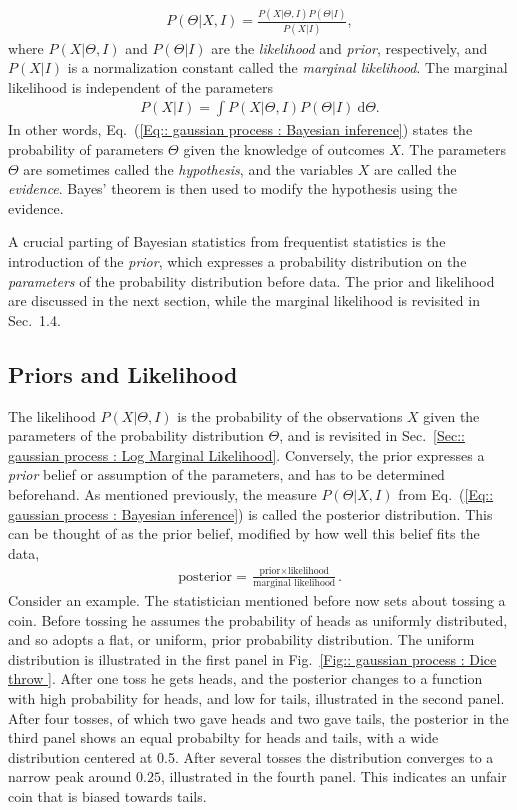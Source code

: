 \documentclass[twoside,english]{uiofysmaster}
\begin{document}
{{\begin{align}\label{Eq:: gaussian process : Bayesian inference}
P(\Theta | X , I) = \frac{P(X|\Theta, I) P(\Theta| I)}{P(X | I)},
\end{align}
where $P(X|\Theta, I)$  and $P(\Theta |I)$ are the \textit{likelihood} and \textit{prior}, respectively, and $P(X|I)$ is a normalization constant called the \textit{marginal likelihood}. The marginal likelihood is independent of the parameters
\begin{align}
P(X|I) = \int P(X| \Theta, I) P(\Theta | I)~ \text{d} \Theta.
\end{align}
In other words, Eq.~(\ref{Eq:: gaussian process : Bayesian inference}) states the probability of parameters $\Theta$ given the knowledge of outcomes $X$. The parameters $\Theta$ are sometimes called the \textit{hypothesis}, and the variables $X$ are called the \textit{evidence}. Bayes' theorem is then used to modify the hypothesis using the evidence. 

A crucial parting of Bayesian statistics from frequentist statistics is the introduction of the \textit{prior}, which expresses a probability distribution on the \textit{parameters} of the probability distribution before data. The prior and likelihood are discussed in the next section, while the marginal likelihood is revisited in Sec.~1.4.

\subsection{Priors and Likelihood}\label{Sec:: gaussian process : Priors and Likelihood}

The likelihood $P(X |\Theta, I)$ is the probability of the observations $X$ given the parameters of the probability distribution $\Theta$, and is revisited in Sec.~\ref{Sec:: gaussian process : Log Marginal Likelihood}. Conversely, the prior expresses a \textit{prior} belief or assumption of the parameters, and has to be determined beforehand. As mentioned previously, the measure $P(\Theta | X , I)$ from Eq.~(\ref{Eq:: gaussian process : Bayesian inference}) is called the posterior distribution. This can be thought of as the prior belief, modified by how well this belief fits the data,
\begin{align*}
\text{posterior} = \frac{\text{prior} \times \text{likelihood}}{\text{marginal likelihood}}.
\end{align*}
Consider an example. The statistician mentioned before now sets about tossing a coin. Before tossing he assumes the probability of heads as uniformly distributed, and so adopts a flat, or uniform, prior probability distribution. The uniform distribution is illustrated in the first panel in Fig.~\ref{Fig:: gaussian process : Dice throw }. After one toss he gets heads, and the posterior changes to a function with high probability for heads, and low for tails, illustrated in the second panel. After four tosses, of which two gave heads and two gave tails, the posterior in the third panel shows an equal probabilty for heads and tails, with a wide distribution centered at 0.5. After several tosses the distribution converges to a narrow peak around $0.25$, illustrated in the fourth panel. This indicates an unfair coin that is biased towards tails.

}}
\end{document}
